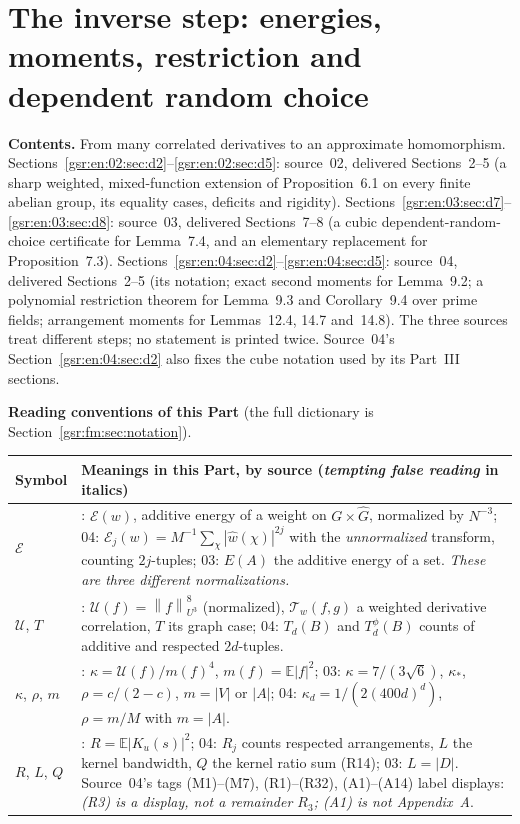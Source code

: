 \documentclass[11pt,letterpaper]{article}
\numberwithin{equation}{section}
\theoremstyle{definition}
\theoremstyle{remark}
\newcommand{\E}{\mathbb E}
\newcommand{\1}{\mathbf 1}
\newcommand{\norm}[1]{\left\|#1\right\|}
\newcommand{\U}{\mathcal U}
\newcommand{\calE}{\mathcal E}
\newcommand{\calT}{\mathcal T}
\newcommand{\partsource}[1]{\par\noindent\begin{minipage}{\textwidth}\small #1\end{minipage}\par\medskip}
\begin{document}
\clearpage
\part{The inverse step: energies, moments, restriction and dependent random choice}\label{gsr:en:part}
\partsource{
\textbf{Contents.} From many correlated derivatives to an approximate homomorphism. Sections~\ref{gsr:en:02:sec:d2}--\ref{gsr:en:02:sec:d5}: source~02, delivered Sections~2--5 (a sharp weighted, mixed-function extension of Proposition~6.1 on every finite abelian group, its equality cases, deficits and rigidity). Sections~\ref{gsr:en:03:sec:d7}--\ref{gsr:en:03:sec:d8}: source~03, delivered Sections~7--8 (a cubic dependent-random-choice certificate for Lemma~7.4, and an elementary replacement for Proposition~7.3). Sections~\ref{gsr:en:04:sec:d2}--\ref{gsr:en:04:sec:d5}: source~04, delivered Sections~2--5 (its notation; exact second moments for Lemma~9.2; a polynomial restriction theorem for Lemma~9.3 and Corollary~9.4 over prime fields; arrangement moments for Lemmas~12.4, 14.7 and~14.8). The three sources treat different steps; no statement is printed twice. Source~04's Section~\ref{gsr:en:04:sec:d2} also fixes the cube notation used by its Part~III sections.
}
\noindent\textbf{Reading conventions of this Part} (the full dictionary is Section~\ref{gsr:fm:sec:notation}).
\begin{center}\small
\begin{tabular}{@{}>{\raggedright\arraybackslash}p{} >{\raggedright\arraybackslash}p{}@{}}
\toprule
Symbol & Meanings in this Part, by source (\emph{tempting false reading} in italics)\\
\midrule
$\mathcal E$ & 02: $\calE(w)$, additive energy of a weight on $G\times\widehat G$, normalized by $N^{-3}$; 04: $\mathcal E_j(w)=M^{-1}\sum_\chi|\widehat w(\chi)|^{2j}$ with the \emph{unnormalized} transform, counting $2j$-tuples; 03: $E(A)$ the additive energy of a set. \emph{These are three different normalizations.}\\
$\U$, $T$ & 02: $\U(f)=\norm f_{U^3}^8$ (normalized), $\calT_w(f,g)$ a weighted derivative correlation, $T$ its graph case; 04: $T_d(B)$ and $T_d^\phi(B)$ counts of additive and respected $2d$-tuples.\\
$\kappa$, $\rho$, $m$ & 02: $\kappa=\U(f)/m(f)^4$, $m(f)=\E|f|^2$; 03: $\kappa=7/(3\sqrt6)$, $\kappa_*$, $\rho=c/(2-c)$, $m=|V|$ or $|A|$; 04: $\kappa_d=1/(2(400d)^d)$, $\rho=m/M$ with $m=|A|$.\\
$R$, $L$, $Q$ & 02: $R=\E|K_u(s)|^2$; 04: $R_j$ counts respected arrangements, $L$ the kernel bandwidth, $Q$ the kernel ratio sum (R14); 03: $L=|D|$. Source~04's tags (M1)--(M7), (R1)--(R32), (A1)--(A14) label displays: \emph{(R3) is a display, not a remainder $R_3$; (A1) is not Appendix~A}.\\
\bottomrule
\end{tabular}
\end{center}
\medskip
\end{document}
